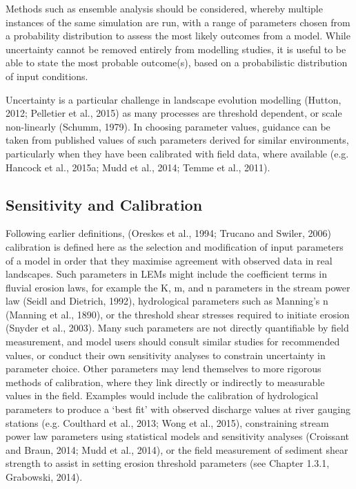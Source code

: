 Methods such as ensemble analysis should be considered, whereby multiple instances of the same simulation are run, with a range of parameters chosen from a probability distribution to assess the most likely outcomes from a model. While uncertainty cannot be removed entirely from modelling studies, it is useful to be able to state the most probable outcome(s), based on a probabilistic distribution of input conditions.

Uncertainty is a particular challenge in landscape evolution modelling (Hutton, 2012; Pelletier et al., 2015) as many processes are threshold dependent, or scale non-linearly (Schumm, 1979). In choosing parameter values, guidance can be taken from published values of such parameters derived for similar environments, particularly when they have been calibrated with field data, where available (e.g. Hancock et al., 2015a; Mudd et al., 2014; Temme et al., 2011).

\subsection{Sensitivity and Calibration}
Following earlier definitions, (Oreskes et al., 1994; Trucano and Swiler, 2006) calibration is defined here as the selection and modification of input parameters of a model in order that they maximise agreement with observed data in real landscapes. Such parameters in LEMs might include the coefficient terms in fluvial erosion laws, for example the K, m, and n parameters in the stream power law (Seidl and Dietrich, 1992), hydrological parameters such as Manning’s n (Manning et al., 1890), or the threshold shear stresses required to initiate erosion (Snyder et al., 2003). Many such parameters are not directly quantifiable by field measurement, and model users should consult similar studies for recommended values, or conduct their own sensitivity analyses to constrain uncertainty in parameter choice. Other parameters may lend themselves to more rigorous methods of calibration, where they link directly or indirectly to measurable values in the field. Examples would include the calibration of hydrological parameters to produce a ‘best fit’ with observed discharge values at river gauging stations (e.g. Coulthard et al., 2013; Wong et al., 2015), constraining stream power law parameters using statistical models and sensitivity analyses (Croissant and Braun, 2014; Mudd et al., 2014), or the field measurement of sediment shear strength to assist in setting erosion threshold parameters (see Chapter 1.3.1, Grabowski, 2014).

